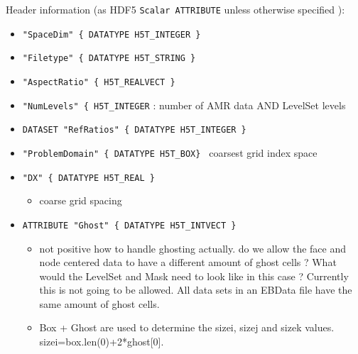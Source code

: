 Header information (as HDF5 {\tt Scalar ATTRIBUTE} unless otherwise specified ):
    \begin{itemize}
    \item {\tt "SpaceDim" \{ DATATYPE  H5T\_INTEGER \}}
    \item {\tt "Filetype" \{ DATATYPE  H5T\_STRING \}}
    \item {\tt "AspectRatio" \{  H5T\_REALVECT \} }
    \item {\tt "NumLevels" \{ H5T\_INTEGER} : number of AMR data AND LevelSet levels
    \item {\tt DATASET "RefRatios" \{ DATATYPE  H5T\_INTEGER \}}
    \item {\tt "ProblemDomain" \{ DATATYPE H5T\_BOX\} } coarsest grid index space
    \item {\tt "DX" \{ DATATYPE  H5T\_REAL \}}
         \begin{itemize} \item  coarse grid spacing \end{itemize}
    \item {\tt ATTRIBUTE  "Ghost" \{ DATATYPE H5T\_INTVECT \}}
    \begin{itemize}
        \item not positive how to handle ghosting actually.  do we allow the face and node centered
            data to have a different amount of ghost cells ?  What would the LevelSet and Mask
            need to look like in this case ?
            Currently this is not going to be allowed. All data sets in an EBData file have the same
           amount of ghost cells.
        \item Box + Ghost are used to determine the sizei, sizej and sizek values. 
                sizei=box.len(0)+2*ghost[0].
    \end{itemize}
 


\end{itemize}
